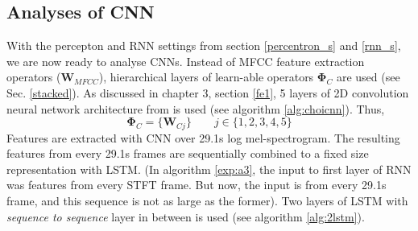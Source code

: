 \subsection{Analyses of CNN}
\label{cnn_s}
With the percepton and RNN settings from section \ref{percentron_s} and \ref{rnn_s}, we are now ready to analyse CNNs. Instead of MFCC feature extraction operators ($\textbf{W}_{MFCC}$), hierarchical layers of learn-able operators $\bm{\Phi}_{C}$ are used (see Sec. \ref{stacked}). As discussed in chapter 3, section \ref{fe1}, 5 layers of 2D convolution neural network architecture from \cite{choi_cnn} is used (see algorithm \ref{alg:choicnn}). Thus,
\[
\bm{\Phi}_{C} = \{\textbf{W}_{Cj}\} \qquad j \in \{1,2,3,4,5\}
\]    
Features are extracted with CNN over 29.1s log mel-spectrogram. The resulting features from every 29.1s frames are sequentially combined to a fixed size representation with LSTM. (In algorithm \ref{exp:a3}, the input to first layer of RNN was features from every STFT frame. But now, the input is from every 29.1s frame, and this sequence is not as large as the former). Two layers of LSTM with \textit{sequence to sequence} layer in between is used (see algorithm \ref{alg:2lstm}).  
